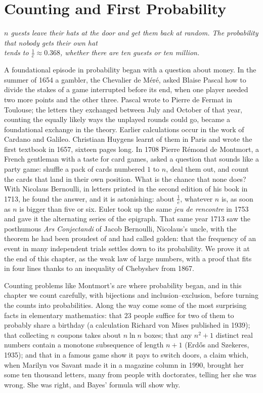 \chapter{Counting and First Probability}\label{ch:probability}

\begin{center}\itshape
$n$ guests leave their hats at the door and get them back at random. The probability that nobody gets their own hat\\
tends to $\frac1e\approx0.368$, whether there are ten guests or ten million.
\end{center}

A foundational episode in probability began with a question about money. In the summer of 1654 a gambler, the Chevalier de M\'er\'e, asked Blaise Pascal how to divide the
stakes of a game interrupted before its end, when one player needed two more points and the other three. Pascal wrote to Pierre de Fermat in Toulouse;
the letters they exchanged between July and October of that year, counting the equally likely ways the unplayed rounds could go, became a foundational
exchange in the theory. Earlier calculations occur in the work of Cardano and Galileo. Christiaan Huygens learnt of them in Paris and wrote the first textbook in 1657, sixteen pages long. In 1708 Pierre
R\'emond de Montmort, a French gentleman with a taste for card games, asked a question that sounds like a party game: shuffle a pack of cards numbered
$1$ to $n$, deal them out, and count the cards that land in their own position. What is the chance that none does? With Nicolaus Bernoulli, in
letters printed in the second edition of his book in 1713, he found the answer, and it is astonishing: about $\frac1e$, whatever $n$ is, as soon as
$n$ is bigger than five or six. Euler took up the same \emph{jeu de rencontre} in 1753 and gave it the alternating series of the epigraph. That same
year 1713 saw the posthumous \emph{Ars Conjectandi} of Jacob Bernoulli, Nicolaus's uncle, with the theorem he had been proudest of and had called golden:
that the frequency of an event in many independent trials settles down to its probability. We prove it at the end of this chapter, as the weak
law of large numbers, with a proof that fits in four lines thanks to an inequality of Chebyshev from 1867.

Counting problems like Montmort's are where probability began, and in this chapter we count carefully, with bijections and inclusion--exclusion,
before turning the counts into probabilities. Along the way come some of the most surprising facts in elementary mathematics: that $23$ people
suffice for two of them to probably share a birthday (a calculation Richard von Mises published in 1939); that collecting $n$ coupons takes about
$n\ln n$ boxes; that any $n^2+1$ distinct real numbers contain a monotone subsequence of length $n+1$ (Erd\H os and Szekeres, 1935); and that in a famous game show it pays to
switch doors, a claim which, when Marilyn vos Savant made it in a magazine column in 1990, brought her some ten thousand letters, many from
people with doctorates, telling her she was wrong. She was right, and Bayes' formula will show why.

